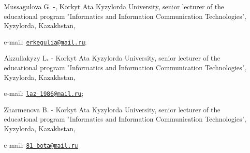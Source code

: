 \begin{authorinfo}
Mussagulova G. -, Korkyt Ata Kyzylorda University, senior lecturer of
the educational program "Informatics and Information Communication
Technologies", Kyzylorda, Kazakhstan,

e-mail: \href{mailto:erkegulia@mail.ru}{\nolinkurl{erkegulia@mail.ru}};

Akzullakyzy L{\bfseries .} - Korkyt Ata Kyzylorda University, senior
lecturer of the educational program "Informatics and Information
Communication Technologies", Kyzylorda, Kazakhstan,

e-mail: \href{mailto:laz_1986@mail.ru}{\nolinkurl{laz\_1986@mail.ru}};

Zharmenova B. - Korkyt Ata Kyzylorda University, senior lecturer of the
educational program "Informatics and Information Communication
Technologies", Kyzylorda, Kazakhstan,

e-mail: \href{mailto:81_bota@mail.ru}{\nolinkurl{81\_bota@mail.ru}}
\end{authorinfo}
